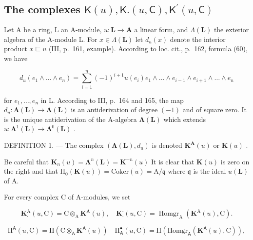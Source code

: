 \subsection{\texorpdfstring{The complexes \(\mathsf{K}(u),\mathsf{K}.(u,\mathsf{C}),\mathsf{K}^{\prime}(u,\mathsf{C})\)}{The complexes \textbackslash mathsf\{K\}(u),\textbackslash mathsf\{K\}.(u,\textbackslash mathsf\{C\}),\textbackslash mathsf\{K\}\^{}\{\textbackslash prime\}(u,\textbackslash mathsf\{C\})}}

Let A be a ring, L an A-module, \(u: \mathbf{L} \to \mathbf{A}\) a linear form, and \(\Lambda(\mathbf{L})\) the exterior algebra of the A-module L. For \(x \in \Lambda(\mathbf{L})\)  let \(d_u(x)\) denote the interior product \(x \sqsubseteq u\) (III, p.~161, example). According to loc. cit., p.~162, formula (60), we have

\[
d _ {u} \left(e _ {1} \wedge \dots \wedge e _ {n}\right) = \sum_ {i = 1} ^ {n} (- 1) ^ {i + 1} u \left(e _ {i}\right) e _ {1} \wedge \dots \wedge e _ {i - 1} \wedge e _ {i + 1} \wedge \dots \wedge e _ {n}\tag{1}
\]

for \(e_1, \ldots, e_n\) in L. According to III, p.~164 and 165, the map \(d_u: \symbf{\Lambda}(\mathbf{L}) \to \symbf{\Lambda}(\mathbf{L})\) is an antiderivation of degree \((-1)\) and of square zero. It is the unique antiderivation of the A-algebra \(\symbf{\Lambda}(\mathbf{L})\) which extends \(u: \symbf{\Lambda}^1(\mathbf{L}) \to \symbf{\Lambda}^0(\mathbf{L})\) .

DEFINITION 1. --- The complex \((\symbf{\Lambda}(\mathbf{L}), d_u)\) is denoted \(\mathbf{K}^{\mathbf{A}}(u)\) or \(\mathbf{K}(u)\) .

Be careful that \(\mathbf{K}_{n}(u)=\symbf{\Lambda}^{n}(\mathbf{L})=\mathbf{K}^{-n}(u)\) It is clear that \(\mathbf{K}(u)\) is zero on the right and that \(\mathrm{H}_{0}(\mathbf{K}(u))=\mathrm{Coker}(u)=\mathrm{A}/\mathfrak{q}\) where \(\mathfrak{q}\) is the ideal \(u(\mathbf{L})\) of A.

For every complex C of A-modules, we set

\[
\mathbf {K} _ {\cdot} ^ {\mathrm{A}} (u, \mathrm{C}) = \mathrm{C} \otimes_ {\mathrm{A}} \mathbf {K} ^ {\mathrm{A}} (u), \quad \mathbf {K} _ {\cdot} ^ {\cdot} (u, \mathrm{C}) = \operatorname{Homgr} _ {\mathrm{A}} (\mathbf {K} ^ {\mathrm{A}} (u), \mathrm{C}).
\]

\[
\mathrm{H} ^ {\mathsf {A}} (u, \mathrm{C}) = \mathrm{H} (\mathrm{C} \otimes_ {\mathsf {A}} \mathbf {K} ^ {\mathsf {A}} (u)) \quad \mathrm{H} _ {\mathsf {A}} ^ {\bullet} (u, \mathrm{C}) = \mathrm{H} (\mathrm{Homgr} _ {\mathsf {A}} (\mathbf {K} ^ {\mathsf {A}} (u), \mathrm{C})) ,
\]

